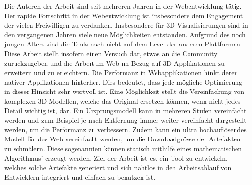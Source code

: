 Die Autoren der Arbeit sind seit mehreren Jahren in der Webentwicklung tätig. Der rapide Fortschritt in der Webentwicklung ist insbesondere dem Engagement der vielen Freiwilligen zu verdanken.
Insbesondere für 3D Visualisierungen sind in den vergangenen Jahren viele neue Möglichkeiten entstanden. Aufgrund des noch jungen Alters sind die Tools noch nicht auf dem Level der anderen Plattformen. Diese Arbeit stellt insofern einen Versuch dar, etwas an die Community zurückzugeben und die Arbeit im Web im Bezug auf 3D-Applikationen zu erweitern und zu erleichtern.
Die Performanz in Webapplikationen hinkt derer nativer Applikationen hinterher. Dies bedeutet, dass jede mögliche Optimierung in dieser Hinsicht sehr wertvoll ist.
Eine Möglichkeit stellt die Vereinfachung von komplexen 3D-Modellen, welche das Original ersetzen können, wenn nicht jedes Detail wichtig ist, dar.
Ein Ursprungsmodell kann in mehreren Stufen vereinfacht werden und zum Beispiel je nach Entfernung immer weiter vereinfacht dargestellt werden, um die Performanz zu verbessern.
Zudem kann ein ultra hochauflösendes Modell für das Web vereinfacht werden, um die Downloadgrösse der Artefakten zu schmälern.
Diese sogenannten  können statisch mithilfe eines mathematischen Algorithmus' erzeugt werden.
Ziel der Arbeit ist es, ein Tool zu entwickeln, welches solche Artefakte generiert und sich nahtlos in den Arbeitsablauf von Entwicklern integriert und einfach zu benutzen ist.
